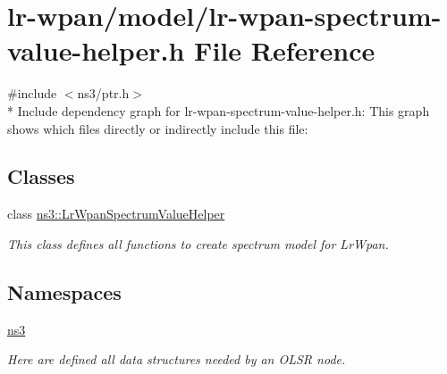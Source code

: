 \hypertarget{lr-wpan-spectrum-value-helper_8h}{}\section{lr-\/wpan/model/lr-\/wpan-\/spectrum-\/value-\/helper.h File Reference}
\label{lr-wpan-spectrum-value-helper_8h}
{\ttfamily \#include $<$ns3/ptr.\+h$>$}\\*
Include dependency graph for lr-\/wpan-\/spectrum-\/value-\/helper.h\+:
This graph shows which files directly or indirectly include this file\+:
\subsection*{Classes}
\begin{DoxyCompactItemize}
\item 
class \hyperlink{classns3_1_1LrWpanSpectrumValueHelper}{ns3\+::\+Lr\+Wpan\+Spectrum\+Value\+Helper}
\begin{DoxyCompactList}\small\item\em This class defines all functions to create spectrum model for Lr\+Wpan. \end{DoxyCompactList}\end{DoxyCompactItemize}
\subsection*{Namespaces}
\begin{DoxyCompactItemize}
\item 
 \hyperlink{namespacens3}{ns3}
\begin{DoxyCompactList}\small\item\em Here are defined all data structures needed by an O\+L\+SR node. \end{DoxyCompactList}\end{DoxyCompactItemize}

